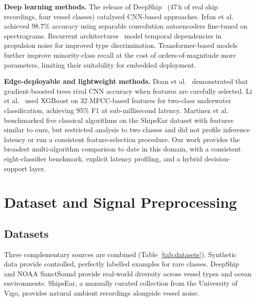 \documentclass[conference]{IEEEtran}
\begin{document}
\textbf{Deep learning methods.} The release of DeepShip~\cite{deepship} (47\,h of real ship recordings, four vessel classes) catalysed CNN-based approaches. Irfan et al.~\cite{deepship} achieved 98.7\% accuracy using separable convolution autoencoders fine-tuned on spectrograms. Recurrent architectures~\cite{rnn_acoustic} model temporal dependencies in propulsion noise for improved type discrimination. Transformer-based models~\cite{transformer_acoustic} further improve minority-class recall at the cost of orders-of-magnitude more parameters, limiting their suitability for embedded deployment.

\textbf{Edge-deployable and lightweight methods.} Doan et al.~\cite{doan2020} demonstrated that gradient-boosted trees rival CNN accuracy when features are carefully selected. Li et al.~\cite{li2022} used XGBoost on 32 MFCC-based features for two-class underwater classification, achieving 95\% F1 at sub-millisecond latency. Martinez et al.~\cite{martinez2021} benchmarked five classical algorithms on the ShipsEar dataset with features similar to ours, but restricted analysis to two classes and did not profile inference latency or run a consistent feature-selection procedure. Our work provides the broadest multi-algorithm comparison to date in this domain, with a consistent eight-classifier benchmark, explicit latency profiling, and a hybrid decision-support layer.

\section{Dataset and Signal Preprocessing}
\label{sec:data}

\subsection{Datasets}

Three complementary sources are combined (Table~\ref{tab:datasets}). Synthetic data provide controlled, perfectly labelled examples for rare classes. DeepShip and NOAA SanctSound provide real-world diversity across vessel types and ocean environments. ShipsEar, a manually curated collection from the University of Vigo, provides natural ambient recordings alongside vessel noise.
\end{document}
